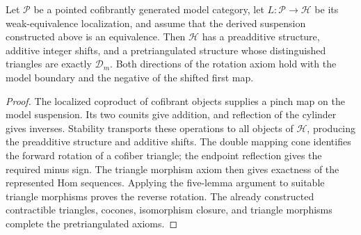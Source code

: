 \begin{theorem}
\label{sem:AdamsSynthetic:model-pretriangulation}
Let $\mathcal P$ be a pointed cofibrantly generated model category,
let $L\colon\mathcal P\to\mathcal H$ be its weak-equivalence localization,
and assume that the derived suspension constructed above is an
equivalence. Then $\mathcal H$ has a preadditive structure, additive
integer shifts, and a pretriangulated structure whose distinguished
triangles are exactly $\mathcal D_m$. Both directions of the rotation
axiom hold with the model boundary and the negative of the shifted
first map.
\end{theorem}
\begin{proof}
The localized coproduct of cofibrant objects supplies a pinch map on the
model suspension. Its two counits give addition, and reflection
of the cylinder gives inverses. Stability transports these operations to
all objects of $\mathcal H$, producing the preadditive structure and
additive shifts. The double mapping cone identifies the forward
rotation of a cofiber triangle; the endpoint reflection gives
the required minus sign. The triangle morphism axiom then gives
exactness of the represented Hom sequences. Applying the five-lemma
argument to suitable triangle morphisms proves the reverse rotation.
The already constructed contractible triangles, cocones, isomorphism
closure, and triangle morphisms complete the pretriangulated axioms.
\end{proof}

